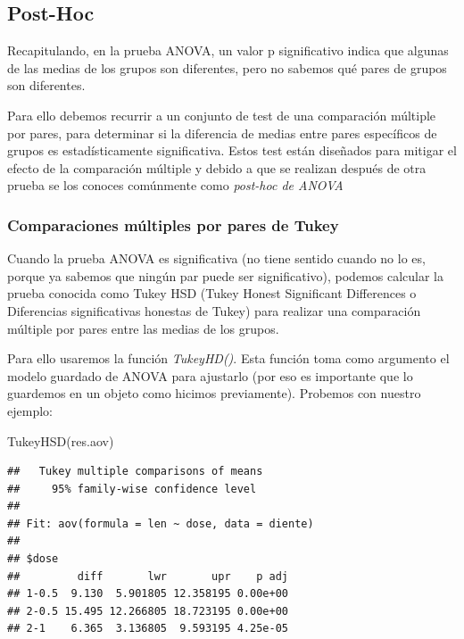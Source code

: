 \documentclass[
]{book}
\newenvironment{Shaded}{\begin{snugshade}}{\end{snugshade}}
\newcommand{\FunctionTok}[1]{\textcolor[rgb]{0.00,0.00,0.00}{#1}}
\newcommand{\NormalTok}[1]{#1}
\begin{document}
\hypertarget{post-hoc}{%
\subsection{Post-Hoc}\label{post-hoc}}

Recapitulando, en la prueba ANOVA, un valor p significativo indica que algunas de las medias de los grupos son diferentes, pero no sabemos qué pares de grupos son diferentes.

Para ello debemos recurrir a un conjunto de test de una comparación múltiple por pares, para determinar si la diferencia de medias entre pares específicos de grupos es estadísticamente significativa. Estos test están diseñados para mitigar el efecto de la comparación múltiple y debido a que se realizan después de otra prueba se los conoces comúnmente como \emph{post-hoc de ANOVA}

\hypertarget{comparaciones-muxfaltiples-por-pares-de-tukey}{%
\subsubsection{Comparaciones múltiples por pares de Tukey}\label{comparaciones-muxfaltiples-por-pares-de-tukey}}

Cuando la prueba ANOVA es significativa (no tiene sentido cuando no lo es, porque ya sabemos que ningún par puede ser significativo), podemos calcular la prueba conocida como Tukey HSD (Tukey Honest Significant Differences o Diferencias significativas honestas de Tukey) para realizar una comparación múltiple por pares entre las medias de los grupos.

Para ello usaremos la función \emph{TukeyHD()}. Esta función toma como argumento el modelo guardado de ANOVA para ajustarlo (por eso es importante que lo guardemos en un objeto como hicimos previamente). Probemos con nuestro ejemplo:

\begin{Shaded}
\begin{Highlighting}[]
\FunctionTok{TukeyHSD}\NormalTok{(res.aov)}
\end{Highlighting}
\end{Shaded}

\begin{verbatim}
##   Tukey multiple comparisons of means
##     95% family-wise confidence level
## 
## Fit: aov(formula = len ~ dose, data = diente)
## 
## $dose
##         diff       lwr       upr    p adj
## 1-0.5  9.130  5.901805 12.358195 0.00e+00
## 2-0.5 15.495 12.266805 18.723195 0.00e+00
## 2-1    6.365  3.136805  9.593195 4.25e-05
\end{verbatim}
\end{document}
